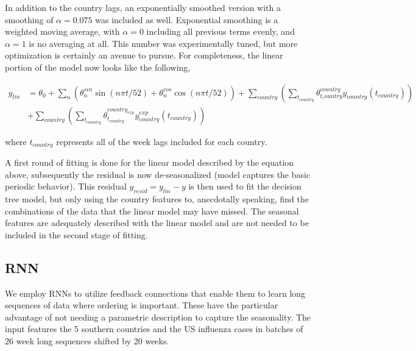 \documentclass[12pt,a4paper,english]{article}
\begin{document}
In addition to the country lags, an exponentially smoothed version with a smoothing of $\alpha = 0.075$ was included as well. Exponential smoothing is a weighted moving average, with $\alpha= 0 $ including all previous terms evenly, and $\alpha=1$ is no averaging at all. This number was experimentally tuned, but more optimization is certainly an avenue to pursue. For completeness, the linear portion of the model now looks like the following,

\begin{align*}
y_{lin} &= \theta_0 + \sum_n\left( \theta^{sin}_n\sin(n\pi t/52)+\theta^{cos}_n\cos(n\pi t/52)\right)+\sum_{country}\left(\sum_{t_{country}}\theta^{country}_{t_country}y_{country}(t_{country})        \right) \\
&+ \sum_{country}\left(  \sum_{t_{country}}\theta^{country_{exp}}_{t_{country}}y^{exp}_{country}(t_{country})  \right)     
\end{align*}

where $t_{country}$ represents all of the week lags included for each country.

A first round of fitting is done for the linear model described by the equation above, subsequently the residual is now de-seasonalized (model captures the basic periodic behavior). This residual $y_{resid} = y_{lin} - y$  is then used to fit the decision tree model, but only using the country features to, anecdotally speaking, find the combinations of the data that the linear model may have missed. The seasonal features are adequately described with the linear model and are not needed to be included in the second stage of fitting.



\subsection{RNN}


We employ RNNs to utilize feedback connections that enable them to learn long sequences of data where ordering is important. These have the particular advantage of not needing a parametric description to capture the seasonality. The input features the 5 southern countries and the US influenza cases in batches of 26 week long sequences shifted by 20 weeks. 

	
\end{document}
